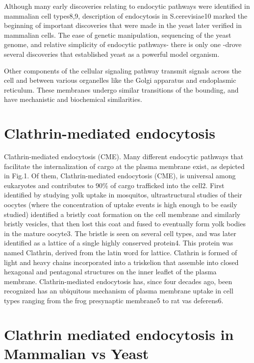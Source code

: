 \vspace{5mm}
Although many early discoveries relating to endocytic pathways were identified in mammalian cell types8,9, description of endocytosis in S.cerevisiae10 marked the beginning of important discoveries that were made in the yeast later verified in mammalian cells. The ease of genetic manipulation, sequencing of the yeast genome, and relative simplicity of endocytic pathways- there is only one -drove several discoveries that established yeast as a powerful model organism.

\vspace{5mm}
Other components of the cellular signaling pathway transmit signals across the cell and between various organelles like the Golgi apparatus and endoplasmic reticulum. These membranes undergo similar transitions of the bounding, and have mechanistic and biochemical similarities. 



\section{Clathrin-mediated endocytosis}
	Clathrin-mediated endocytosis (CME).
Many different endocytic pathways that facilitate the internalization of cargo at the plasma membrane exist, as depicted in Fig.1. Of them, Clathrin-mediated endocytosis (CME), is universal among eukaryotes and contributes to 90\% of cargo trafficked into the cell2. First identified by studying yolk uptake in mosquitos, ultrastructural studies of their oocytes (where the concentration of uptake events is high enough to be easily studied) identified a bristly coat formation on the cell membrane and similarly bristly vesicles, that then lost this coat and fused to eventually form yolk bodies in the mature oocyte3. The bristle is seen on several cell types, and was later identified as a lattice of a single highly conserved protein4. This protein was named Clathrin, derived from the latin word for lattice. Clathrin is formed of light and heavy chains incorporated into a triskelion that assemble into closed hexagonal and pentagonal structures on the inner leaflet of the plasma membrane. Clathrin-mediated endocytosis has, since four decades ago, been recognized has an ubiquitous mechanism of plasma membrane uptake in cell types ranging from the frog presynaptic membrane5 to rat vas deferens6. 

	
\section{Clathrin mediated endocytosis in Mammalian vs Yeast}
